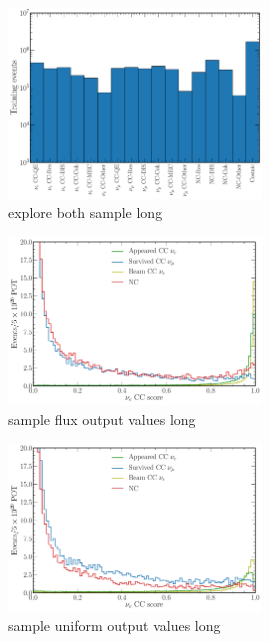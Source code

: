 \begin{figure} %
    \includegraphics[width=0.6\textwidth]{diagrams/7-cvn/chipsnet/explore_both_sample.pdf}
    \caption[explore both sample short]
    {explore both sample long}
    \label{fig:explore_both_sample}
\end{figure}

\begin{figure} %
    \includegraphics[width=0.6\textwidth]{diagrams/7-cvn/chipsnet/sample_flux_output_values.pdf}
    \caption[sample flux output values short]
    {sample flux output values long}
    \label{fig:sample_flux_output_values}
\end{figure}

\begin{figure} %
    \includegraphics[width=0.6\textwidth]{diagrams/7-cvn/chipsnet/sample_uniform_output_values.pdf}
    \caption[sample uniform output values short]
    {sample uniform output values long}
    \label{fig:sample_uniform_output_values}
\end{figure}

